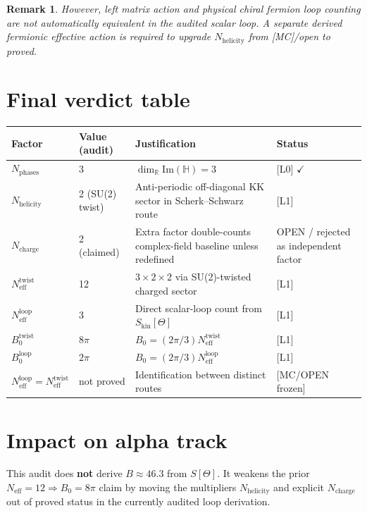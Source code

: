 \documentclass[12pt,a4paper]{article}
\newtheorem{remark}[theorem]{Remark}
\begin{document}
\begin{remark}
However, \emph{left matrix action} and \emph{physical chiral fermion loop counting}
are not automatically equivalent in the audited scalar loop. A separate derived
fermionic effective action is required to upgrade $N_{\mathrm{helicity}}$ from
[MC]/open to proved.
\end{remark}

\section{Final verdict table}
\begin{center}
\begin{tabular}{llll}
\toprule
Factor & Value (audit) & Justification & Status \\
\midrule
$N_{\mathrm{phases}}$ & 3 & $\dim_{\mathbb{R}}\mathrm{Im}(\mathbb{H})=3$ & [L0] $\checkmark$ \\
$N_{\mathrm{helicity}}$ & 2 (SU(2) twist) & Anti-periodic off-diagonal KK sector in Scherk--Schwarz route & [L1] \\
$N_{\mathrm{charge}}$ & 2 (claimed) & Extra factor double-counts complex-field baseline unless redefined & OPEN / rejected as independent factor \\
$N_{\mathrm{eff}}^{\mathrm{twist}}$ & 12 & $3\times2\times2$ via SU(2)-twisted charged sector & [L1] \\
$N_{\mathrm{eff}}^{\mathrm{loop}}$ & 3 & Direct scalar-loop count from $S_{\mathrm{kin}}[\Theta]$ & [L1] \\
$B_0^{\mathrm{twist}}$ & $8\pi$ & $B_0=(2\pi/3)N_{\mathrm{eff}}^{\mathrm{twist}}$ & [L1] \\
$B_0^{\mathrm{loop}}$ & $2\pi$ & $B_0=(2\pi/3)N_{\mathrm{eff}}^{\mathrm{loop}}$ & [L1] \\
$N_{\mathrm{eff}}^{\mathrm{loop}}=N_{\mathrm{eff}}^{\mathrm{twist}}$ & not proved & Identification between distinct routes & [MC/OPEN frozen] \\
\bottomrule
\end{tabular}
\end{center}

\section{Impact on alpha track}
This audit does \textbf{not} derive $B\approx 46.3$ from $S[\Theta]$.
It weakens the prior $N_{\mathrm{eff}}=12\Rightarrow B_0=8\pi$ claim by moving the
multipliers $N_{\mathrm{helicity}}$ and explicit $N_{\mathrm{charge}}$ out of proved
status in the currently audited loop derivation.
\end{document}

